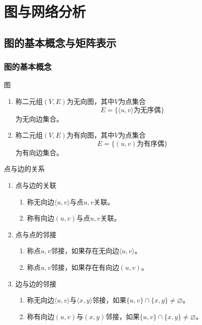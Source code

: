 \documentclass[lang = cn, scheme = chinese, thmcnt = section]{elegantbook}
\begin{document}
\chapter{图与网络分析}

\section{图的基本概念与矩阵表示}

\subsection{图的基本概念}

\begin{definition}{图}
	\begin{enumerate}
		\item 称二元组$(V,E)$为无向图，其中$V$为点集合
		$$
		E=\{ \langle u,v \rangle\text{为无序偶}  \}
		$$
		为无向边集合。
		\item 称二元组$(V,E)$为有向图，其中$V$为点集合
		$$
		E=\{ (u,v)\text{为有序偶}  \}
		$$
		为有向边集合。
	\end{enumerate}
\end{definition}

\begin{definition}{点与边的关系}
	\begin{enumerate}
		\item 点与边的关联
		\begin{enumerate}
			\item 称无向边$\langle u,v \rangle$与点$u,v$关联。
			\item 称有向边$(u,v)$与点$u,v$关联。
		\end{enumerate}
		\item 点与点的邻接
		\begin{enumerate}
			\item 称点$u,v$邻接，如果存在无向边$\langle u,v \rangle$。
			\item 称点$u,v$邻接，如果存在有向边$(u,v)$。
		\end{enumerate}
		\item 边与边的邻接
		\begin{enumerate}
			\item 称无向边$\langle u,v \rangle$与$\langle x,y \rangle$邻接，如果$\{ u,v \}\cap\{ x,y \}\ne\varnothing$。
			\item 称有向边$(u,v)$与$(x,y)$邻接，如果$\{ u,v \}\cap\{ x,y \}\ne\varnothing$。
		\end{enumerate}
	\end{enumerate}
\end{definition}
\end{document}

